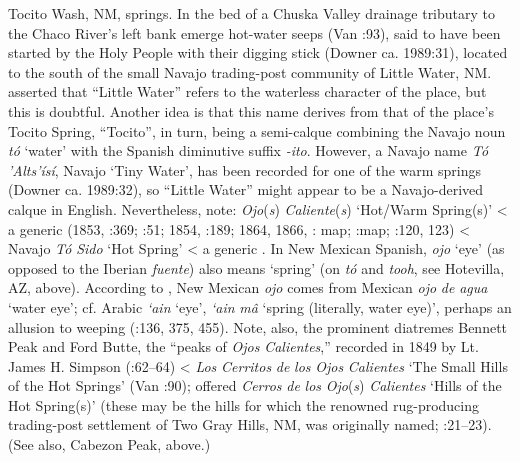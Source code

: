 Tocito Wash, NM, springs.  In the bed of a Chuska Valley drainage tributary to the Chaco River’s left bank emerge hot-water seeps (Van \citealt{Valkenburgh1945}:93), said to have been started by the Holy People with their digging stick (Downer ca. 1989:31), located to the south of the small Navajo trading-post community of Little Water, NM.  \citet[205]{Julyan1998} asserted that “Little Water” refers to the waterless character of the place, but this is doubtful.  Another idea is that this name derives from that of the place’s Tocito Spring, “Tocito”, in turn, being a semi-calque combining the Navajo noun \textit{tó} ‘water’ with the Spanish diminutive suffix \textit{{}-ito}.  However, a Navajo name \textit{Tó} \textit{’Alts’ísí}, Navajo ‘Tiny Water’, has been recorded for one of the warm springs (Downer ca. 1989:32), so “Little Water” might appear to be a Navajo-derived calque in English.  Nevertheless, note: \textit{Ojo}(\textit{s}) \textit{Caliente}(\textit{s}) ‘Hot/Warm Spring(s)’ < a generic (1853, \citealt{Correll1979}:369; \citealt{Bailey1964b}:51; 1854, \citealt{McNitt1964}:189; 1864, 1866, \citealt{Kelley1970}: map; \citealt{Madsen2010}:map; \citealt{Eidenbach2012}:120, 123) < Navajo \textit{Tó} \textit{Sido} ‘Hot Spring’ \citep[112]{Haile1950} < a generic \citep[355]{Julyan1998}.  In New Mexican Spanish, \textit{ojo} ‘eye’ (as opposed to the Iberian \textit{fuente}) also means ‘spring’ (on \textit{tó} and \textit{tooh}, see Hotevilla, AZ, above).  According to \citet[76]{Studerus2001}, New Mexican \textit{ojo} comes from Mexican \textit{ojo} \textit{de} \textit{agua} ‘water eye’; cf. Arabic \textit{‘ain} ‘eye’, \textit{‘ain} \textit{mâ} ‘spring (literally, water eye)’, perhaps an allusion to weeping (\citealt{Steingass1987}:136, 375, 455).  Note, also, the prominent diatremes Bennett Peak and Ford Butte, the “peaks of \textit{Ojos} \textit{Calientes},” recorded in 1849 by Lt. James H. Simpson (\citealt{McNitt1964}:62–64) < \textit{Los} \textit{Cerritos} \textit{de} \textit{los} \textit{Ojos} \textit{Calientes} ‘The Small Hills of the Hot Springs’ (Van \citealt{Valkenburgh1945}:90); \citet[17]{Brugge1965} offered \textit{Cerros} \textit{de} \textit{los} \textit{Ojo}(\textit{s}) \textit{Calientes} ‘Hills of the Hot Spring(s)’ (these may be the hills for which the renowned rug-producing trading-post settlement of Two Gray Hills, NM, was originally named; \citealt{Winter2011}:21–23).  (See also, Cabezon Peak, above.)

